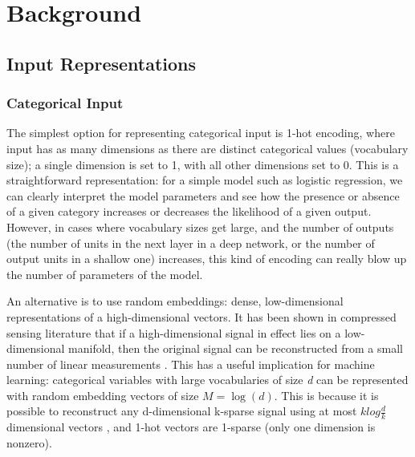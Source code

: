 \chapter{Background}


\section{Input Representations}
\label{data_rep}

\subsection{Categorical Input}

The simplest option for representing categorical input is 1-hot encoding, where input has as many dimensions as there are distinct categorical values (vocabulary size); a single dimension is set to 1, with all other dimensions set to 0.
This is a straightforward representation: for a simple model such as logistic regression, we can clearly interpret the model parameters and see how the presence or absence of a given category increases or decreases the likelihood of a given output.
However, in cases where vocabulary sizes get  large, and the number of outputs (the number of units in the next layer in a deep network,  or the number of output units  in a shallow one) increases, this kind of encoding can really blow up the number of parameters of the model.

An alternative is to use  random embeddings:  dense, low-dimensional representations of a high-dimensional vectors.
It has been shown in compressed sensing literature that if a high-dimensional signal in effect lies on a low-dimensional manifold, then the original signal can be reconstructed from a small number of linear measurements \cite{compressive_sensing2}.
This has a useful implication for machine learning: categorical variables with large vocabularies of size \textit{d}  can be  represented with  random embedding vectors of size $M = \log(d)$.
This is because it is possible to reconstruct any d-dimensional k-sparse signal using at most $k  log{\frac{d}{k}}$ dimensional vectors \cite{compressive_sensing1}, and 1-hot vectors are 1-sparse (only one dimension is nonzero).

